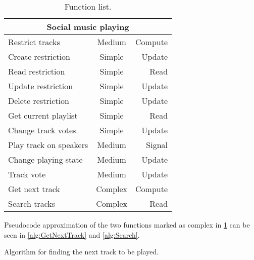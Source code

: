 \begin{table}[hbtp]
\centering
\begin{tabular}{lcr}
\toprule
\multicolumn{3}{c}{\textbf{Social music playing}} \\
\midrule
Restrict tracks                & Medium  & Compute \\
Create restriction             & Simple  & Update  \\
Read restriction               & Simple  & Read    \\
Update restriction             & Simple  & Update  \\
Delete restriction             & Simple  & Update  \\
Get current playlist           & Simple  & Read    \\
Change track votes             & Simple  & Update  \\
Play track on speakers         & Medium  & Signal  \\
Change playing state           & Medium  & Update  \\
Track vote                     & Medium  & Update  \\
Get next track                 & Complex & Compute \\
Search tracks                  & Complex & Read    \\
\bottomrule
\end{tabular}
\caption{Function list.}
\label{table:functionlist}
\end{table}

Pseudocode approximation of the two functions marked as complex in \cref{table:functionlist} can be seen in \cref{alg:GetNextTrack} and \cref{alg:Search}.

\begin{algorithm}[htbp]
\caption{Algorithm for finding the next track to be played.}\label{alg:GetNextTrack}
\begin{algorithmic}[1]
		\EndIf{}
			\Else{} 
					\EndIf{}
				\EndIf{}
			\EndIf{}
		\EndFor{}
	\EndFunction{}
\end{algorithmic}
\end{algorithm}

